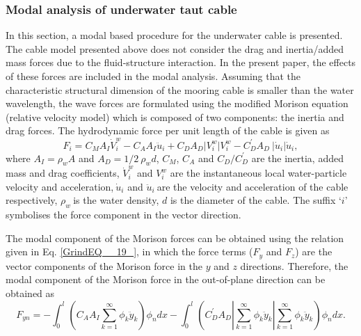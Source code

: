 \documentclass[review]{elsarticle}
\begin{document}
\subsubsection{Modal analysis of underwater taut cable}
In this section, a modal based procedure for the underwater cable is presented. The cable model presented above does not consider the drag and inertia/added mass forces due to the fluid-structure interaction. In the present paper, the effects of these forces are included in the modal analysis. Assuming that the characteristic structural dimension of the mooring cable is smaller than the water wavelength, the wave forces are formulated using the modified Morison equation (relative velocity model) which is composed of two components: the inertia and drag forces. The hydrodynamic force per unit length of the cable is given as
\begin{equation} \label{GrindEQ__20_} 
F_i={{C}}_{{M}}{{A}}_{{I}}{\dot{V}}^w_i-{{C}}_{{A}}{{A}}_{{I}}{\ddot{u}}_i+{{C}}_{{D}}{{A}}_{{D}}{|}V^w_i{|}V^w_i-C^{'}_D{{A}}_{{D}}\ |{\dot{u}}_i|{\dot{u}}_i,
\end{equation} 
where ${{A}}_{{I}}{=}{\rho }_wA$ and ${{A}}_{{D}}{=1/2\ }{\rho }_w{d}$, $C_{M }$, $C_{A}$ and $C_{D} / C^{'}_D$ are the inertia, added mass and drag coefficients, ${\dot{V}}^w_i$ and $V^w_i$ are the instantaneous local water-particle velocity and acceleration,$\ {\dot{u}}_i$ and ${\ddot{u}}_i\ $are the velocity and acceleration of the cable respectively, ${\rho }_w\ $is the water density, ${d}$ is the diameter of the cable. The suffix `$i$' symbolises the force component in the vector direction.

The modal component of the Morison forces can be obtained using the relation given in Eq. \eqref{GrindEQ__19_}, in which the force terms ($F_y$ and $F_z$) are the vector components of the Morison force in the $y$ and $z$ directions. Therefore, the modal component of the Morison force in the out-of-plane direction can be obtained as
\begin{equation} \label{GrindEQ__21_} 
F_{yn}=-\int^l_0{\left(C_AA_I\sum^{\infty }_{k=1}{{\phi }_k}{\ddot{y}}_k\right)}{\phi }_ndx-\int^l_0{\left(C^{'}_DA_D\left|\sum^{\infty }_{k=1}{{\phi }_k}{\ddot{y}}_k\right|\sum^{\infty }_{k=1}{{\phi }_k}{\ddot{y}}_k\right)}{\phi }_ndx.    
\end{equation} 
\end{document}
